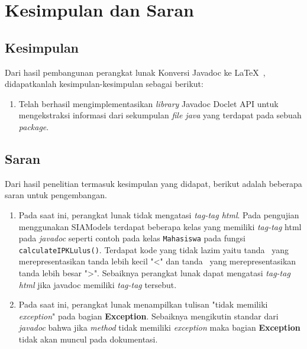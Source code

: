 \chapter{Kesimpulan dan Saran}
\label{sec:kesimpulan dan saran}

\section{Kesimpulan}
\label{sec:kesimpulan}
Dari hasil pembangunan perangkat lunak Konversi Javadoc ke \LaTeX\ , didapatkanlah kesimpulan-kesimpulan sebagai berikut:
\begin{enumerate}
	\item Telah berhasil mengimplementasikan {\it library} Javadoc Doclet API untuk mengekstraksi informasi dari sekumpulan {\it file java} yang terdapat pada sebuah {\it package}.
\end{enumerate}

\section{Saran}
\label{sec:saran}
Dari hasil penelitian termasuk kesimpulan yang didapat, berikut adalah beberapa saran untuk pengembangan.
\begin{enumerate}
	\item Pada saat ini, perangkat lunak tidak mengatasi {\it tag-tag html}. Pada pengujian menggunakan SIAModels terdapat beberapa kelas yang memiliki {\it tag-tag} html pada {\it javadoc} seperti contoh pada kelas {\tt Mahasiswa} pada fungsi {\tt calculateIPKLulus()}. Terdapat kode yang tidak lazim yaitu tanda \textexclamdown\ yang merepresentasikan tanda lebih kecil "<" dan tanda \textquestiondown\ yang merepresentasikan tanda lebih besar ">". Sebaiknya perangkat lunak dapat mengatasi {\it tag-tag html} jika javadoc memiliki {\it tag-tag} tersebut.
	\item Pada saat ini, perangkat lunak menampilkan tulisan "tidak memiliki {\it exception}" pada bagian {\bf Exception}. Sebaiknya mengikutin standar dari {\it javadoc} bahwa jika {\it method} tidak memiliki {\it exception} maka bagian {\bf Exception} tidak akan muncul pada dokumentasi.
\end{enumerate}
